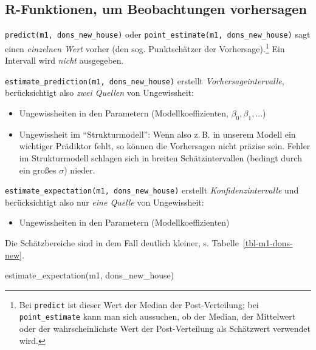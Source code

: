 \documentclass[
  ngerman,
  letterpaper,
  twoside,
  open=any]{scrbook}
\newenvironment{Shaded}{\begin{snugshade}}{\end{snugshade}}
\newcommand{\FunctionTok}[1]{\textcolor[rgb]{0.28,0.35,0.67}{#1}}
\newcommand{\NormalTok}[1]{\textcolor[rgb]{0.00,0.23,0.31}{#1}}
\providecommand{\tightlist}{%
  \setlength{\itemsep}{0pt}\setlength{\parskip}{0pt}}\usepackage{longtable,booktabs,array}
\theoremstyle{definition}
\theoremstyle{plain}
\theoremstyle{definition}
\theoremstyle{definition}
\theoremstyle{definition}
\theoremstyle{definition}
\theoremstyle{remark}
\begin{document}
\subsection{R-Funktionen, um Beobachtungen
vorhersagen}\label{r-funktionen-um-beobachtungen-vorhersagen}

\texttt{predict(m1,\ dons\_new\_house)} oder
\texttt{point\_estimate(m1,\ dons\_new\_house)} sagt einen
\emph{einzelnen Wert} vorher (den sog. Punktschätzer der
Vorhersage).\footnote{Bei \texttt{predict} ist dieser Wert der Median
  der Post-Verteilung; bei \texttt{point\_estimate} kann man sich
  aussuchen, ob der Median, der Mittelwert oder der wahrscheinlichste
  Wert der Post-Verteilung als Schätzwert verwendet wird.} Ein Intervall
wird \emph{nicht} ausgegeben.

\texttt{estimate\_prediction(m1,\ dons\_new\_house)} erstellt
\emph{Vorhersageintervalle}, berücksichtigt also \emph{zwei Quellen} von
Ungewissheit:

\begin{itemize}
\tightlist
\item
  Ungewissheiten in den Parametern (Modellkoeffizienten,
  \(\beta_0, \beta_1, ...\))
\item
  Ungewissheit im \enquote{Strukturmodell}: Wenn also z.\,B. in unserem
  Modell ein wichtiger Prädiktor fehlt, so können die Vorhersagen nicht
  präzise sein. Fehler im Strukturmodell schlagen sich in breiten
  Schätzintervallen (bedingt durch ein großes \(\sigma\)) nieder.
\end{itemize}

\texttt{estimate\_expectation(m1,\ dons\_new\_house)} erstellt
\emph{Konfidenzintervalle} und berücksichtigt also nur \emph{eine
Quelle} von Ungewissheit:

\begin{itemize}
\tightlist
\item
  Ungewissheiten in den Parametern (Modellkoeffizienten)
\end{itemize}

Die Schätzbereiche sind in dem Fall deutlich kleiner, s.
Tabelle~\ref{tbl-m1-dons-new}.

\begin{Shaded}
\begin{Highlighting}[]
\FunctionTok{estimate\_expectation}\NormalTok{(m1, dons\_new\_house)}
\end{Highlighting}
\end{Shaded}
\end{document}
